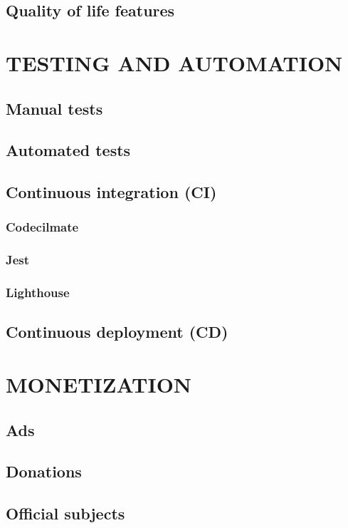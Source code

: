 \section{Quality of life features}

\chapter{TESTING AND AUTOMATION}
\label{chap:testing}

\section{Manual tests}
\section{Automated tests}
\section{Continuous integration (CI)}
\subsection*{Codecilmate}
\subsection*{Jest}
\subsection*{Lighthouse}
\section{Continuous deployment (CD)}

\chapter{MONETIZATION} %
\label{chap:monetization}

\section{Ads}
\section{Donations}
\section{Official subjects}


